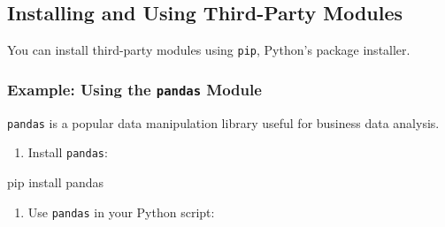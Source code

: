 \documentclass[
  letterpaper,
  DIV=11,
  numbers=noendperiod]{scrreprt}
\newenvironment{Shaded}{\begin{snugshade}}{\end{snugshade}}
\newcommand{\BuiltInTok}[1]{\textcolor[rgb]{0.00,0.23,0.31}{#1}}
\newcommand{\CommentTok}[1]{\textcolor[rgb]{0.37,0.37,0.37}{#1}}
\newcommand{\DecValTok}[1]{\textcolor[rgb]{0.68,0.00,0.00}{#1}}
\newcommand{\ExtensionTok}[1]{\textcolor[rgb]{0.00,0.23,0.31}{#1}}
\newcommand{\ImportTok}[1]{\textcolor[rgb]{0.00,0.46,0.62}{#1}}
\newcommand{\NormalTok}[1]{\textcolor[rgb]{0.00,0.23,0.31}{#1}}
\newcommand{\OperatorTok}[1]{\textcolor[rgb]{0.37,0.37,0.37}{#1}}
\newcommand{\SpecialCharTok}[1]{\textcolor[rgb]{0.37,0.37,0.37}{#1}}
\newcommand{\SpecialStringTok}[1]{\textcolor[rgb]{0.13,0.47,0.30}{#1}}
\newcommand{\StringTok}[1]{\textcolor[rgb]{0.13,0.47,0.30}{#1}}
\providecommand{\tightlist}{%
  \setlength{\itemsep}{0pt}\setlength{\parskip}{0pt}}\usepackage{longtable,booktabs,array}
\begin{document}
\subsection{Installing and Using Third-Party
Modules}\label{installing-and-using-third-party-modules}

You can install third-party modules using \texttt{pip}, Python's package
installer.

\subsubsection{\texorpdfstring{Example: Using the \texttt{pandas}
Module}{Example: Using the pandas Module}}\label{example-using-the-pandas-module}

\texttt{pandas} is a popular data manipulation library useful for
business data analysis.

\begin{enumerate}
\def\labelenumi{\arabic{enumi}.}
\tightlist
\item
  Install \texttt{pandas}:
\end{enumerate}

\begin{Shaded}
\begin{Highlighting}[]
\ExtensionTok{pip}\NormalTok{ install pandas}
\end{Highlighting}
\end{Shaded}

\begin{enumerate}
\def\labelenumi{\arabic{enumi}.}
\setcounter{enumi}{1}
\tightlist
\item
  Use \texttt{pandas} in your Python script:
\end{enumerate}

\begin{Shaded}
\end{Shaded}
\end{document}
